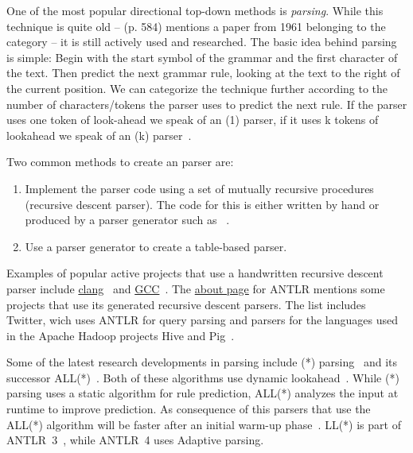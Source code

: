 One of the most popular directional top-down methods is \emph{ parsing}. While this technique is quite old –  (p. 584) mentions a paper from 1961 belonging to the  category – it is still actively used and researched. The basic idea behind  parsing is simple: Begin with the start symbol of the grammar and the first character of the text. Then predict the next grammar rule, looking at the text to the right of the current position. We can categorize the technique further according to the number of characters/tokens the parser uses to predict the next rule. If the parser uses one token of look-ahead we speak of an (1) parser, if it uses k tokens of lookahead we speak of an (k) parser~\cite{rosenkrantz1969properties}.

Two common methods to create an  parser are:

\begin{enumerate}

  \item Implement the parser code using a set of mutually recursive procedures (recursive descent parser). The code for this is either written by hand or produced by a parser generator such as ~\cite{parr2013recursive}.

  \item Use a parser generator to create a table-based parser.

\end{enumerate}

Examples of popular active projects that use a handwritten recursive descent parser include \href{http://clang.llvm.org}{clang}~\cite{bendersky2012clang} and \href{http://gcc.gnu.org}{GCC}~\cite{myers2008cparser}. The \href{http://www.antlr.org/about.html}{about page} for \gls{ANTLR} mentions some projects that use its generated recursive descent parsers. The list includes Twitter, wich uses ANTLR for query parsing and parsers for the languages used in the Apache Hadoop projects Hive and Pig~\cite{parr2013definitive}.

Some of the latest research developments in  parsing include (*) parsing~\cite{parr2011ll} and its successor \gls{ALL(*)}~\cite{parr2014adaptive}. Both of these algorithms use dynamic lookahead~\cite[p. 1]{parr2011ll}. While (*) parsing uses a static algorithm for rule prediction, ALL(*) analyzes the input at runtime to improve prediction. As consequence of this parsers that use the \gls{ALL(*)} algorithm will be faster after an initial warm-up phase~\cite[p. 3]{parr2014adaptive}. LL(*) is part of \gls{ANTLR}~3~\cite[p. 3]{parr2014adaptive}, while \gls{ANTLR}~4 uses Adaptive  parsing.

